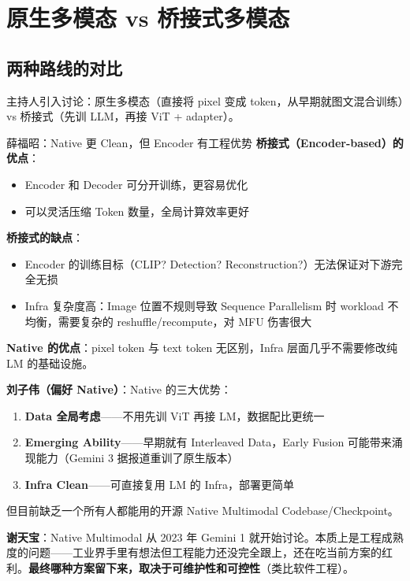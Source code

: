 \section{原生多模态 vs 桥接式多模态}

\subsection{两种路线的对比}

主持人引入讨论：原生多模态（直接将 pixel 变成 token，从早期就图文混合训练）vs 桥接式（先训 LLM，再接 ViT + adapter）。

\begin{importantbox}{薛福昭：Native 更 Clean，但 Encoder 有工程优势}
\textbf{桥接式（Encoder-based）的优点}：
\begin{itemize}
  \item Encoder 和 Decoder 可分开训练，更容易优化
  \item 可以灵活压缩 Token 数量，全局计算效率更好
\end{itemize}
\textbf{桥接式的缺点}：
\begin{itemize}
  \item Encoder 的训练目标（CLIP? Detection? Reconstruction?）无法保证对下游完全无损
  \item Infra 复杂度高：Image 位置不规则导致 Sequence Parallelism 时 workload 不均衡，需要复杂的 reshuffle/recompute，对 MFU 伤害很大
\end{itemize}
\textbf{Native 的优点}：pixel token 与 text token 无区别，Infra 层面几乎不需要修改纯 LM 的基础设施。
\end{importantbox}

\textbf{刘子伟（偏好 Native）}：Native 的三大优势：
\begin{enumerate}
  \item \textbf{Data 全局考虑}——不用先训 ViT 再接 LM，数据配比更统一
  \item \textbf{Emerging Ability}——早期就有 Interleaved Data，Early Fusion 可能带来涌现能力（Gemini 3 据报道重训了原生版本）
  \item \textbf{Infra Clean}——可直接复用 LM 的 Infra，部署更简单
\end{enumerate}
但目前缺乏一个所有人都能用的开源 Native Multimodal Codebase/Checkpoint。

\textbf{谢天宝}：Native Multimodal 从 2023 年 Gemini 1 就开始讨论。本质上是工程成熟度的问题——工业界手里有想法但工程能力还没完全跟上，还在吃当前方案的红利。\textbf{最终哪种方案留下来，取决于可维护性和可控性}（类比软件工程）。

